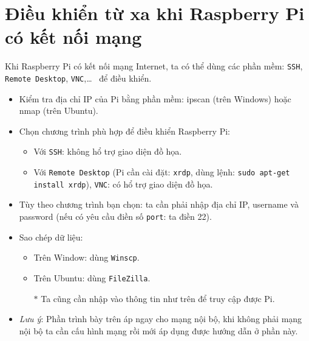 \section{Điều khiển từ xa khi Raspberry Pi có kết nối mạng}
Khi Raspberry Pi có kết nối mạng Internet, ta có thể dùng các phần mềm: \verb|SSH|, \verb|Remote Desktop|, \verb|VNC|,\ldots~ để điều khiển.
\begin{itemize}
\item Kiểm tra địa chỉ IP của Pi bằng phần mềm: ipscan (trên Windows) hoặc nmap (trên Ubuntu).
\item Chọn chương trình phù hợp để điều khiển Raspberry Pi: 
\begin{itemize}
\item Với \verb|SSH|: không hổ trợ giao diện đồ họa.
\item Với \verb|Remote Desktop| (Pi cần cài đặt: \verb|xrdp|, dùng lệnh: \verb|sudo apt-get install xrdp|), \verb|VNC|: có hổ trợ giao diện đồ họa.
\end{itemize}
\item Tùy theo chương trình bạn chọn: ta cần phải nhập địa chỉ IP, username và password (nếu có yêu cầu điền số \verb|port|: ta điền 22).
\item Sao chép dữ liệu:
\begin{itemize}
\item Trên Window: dùng \verb|Winscp|.
\item Trên Ubuntu: dùng \verb|FileZilla|.
\item[$\ast$] Ta cũng cần nhập vào thông tin như trên để truy cập được Pi.
\end{itemize}
\item \textit{Lưu ý}: Phần trình bày trên áp ngay cho mạng nội bộ, khi không phải mạng nội bộ ta cần cấu hình mạng rồi mới áp dụng được hướng dẫn ở phần này.
\end{itemize}

